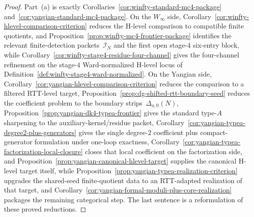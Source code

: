 \begin{proof}
Part~\textup{(a)} is exactly
Corollaries~\ref{cor:winfty-standard-mc4-package}
and~\ref{cor:yangian-standard-mc4-package}.  On the
\texorpdfstring{$W_\infty$}{W_infty} side,
Corollary~\ref{cor:winfty-hlevel-comparison-criterion} reduces the
H-level comparison to compatible finite quotients, and
Proposition~\ref{prop:winfty-mc4-frontier-package} identifies the
relevant finite-detection packets~$\mathcal{I}_N$ and the first open
stage-$4$ six-entry block, while
Corollary~\ref{cor:winfty-stage4-residue-four-channel} gives the
four-channel refinement on the stage-$4$ Ward-normalized H-level
locus of Definition~\ref{def:winfty-stage4-ward-normalized}.
On the Yangian side,
Corollary~\ref{cor:yangian-hlevel-comparison-criterion} reduces the
comparison to a filtered RTT-level target,
Proposition~\ref{prop:dg-shifted-rtt-boundary-seed} reduces the
coefficient problem to the boundary strips~$\Delta_{a,0}(N)$,
Proposition~\ref{prop:yangian-dk4-typea-frontier} gives the standard
type-$A$ sharpening to the auxiliary-kernel/residue packet,
Corollary~\ref{cor:yangian-typea-degree2-plus-generators} gives the
single degree-$2$ coefficient plus compact-generator formulation under
one-loop exactness,
Corollary~\ref{cor:yangian-typea-factorization-local-closure} closes
that local coefficient on the factorization side, and
Proposition~\ref{prop:yangian-canonical-hlevel-target} supplies the
canonical H-level target itself, while
Proposition~\ref{prop:yangian-typea-realization-criterion} upgrades the
shared-seed finite-quotient data to an RTT-adapted realization of that
target, and
Corollary~\ref{cor:yangian-formal-moduli-plus-core-realization}
packages the remaining categorical step.  The last sentence is a
reformulation of these proved reductions.
\end{proof}

